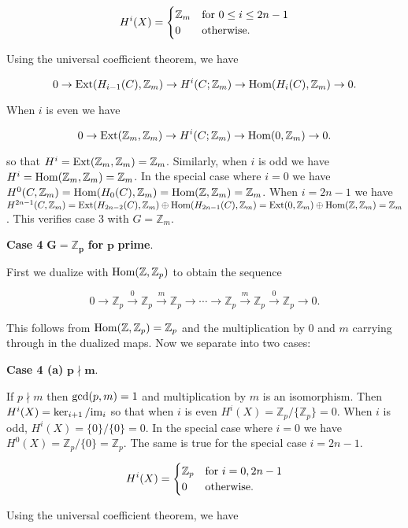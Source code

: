 \documentclass{article}
\newcommand{\Z}{\mathbb{Z}}
\newcommand{\Hom}{\textnormal{Hom}}
\newcommand{\Ext}{\textnormal{Ext}}
\newcommand{\im}{\textnormal{im}}
\begin{document}
\[H^{i}(X) = \begin{cases} \Z_{m} & \textnormal{for } 0\leq i\leq 2n-1\\
0 & \textnormal{otherwise}. \end{cases}\]
\medskip

Using the universal coefficient theorem, we have

$$0\to \Ext(H_{i-1}(C), \Z_{m})\to H^{i}(C;\Z_{m})\to \Hom(H_{i}(C),\Z_{m})\to 0.$$

When $i$ is even we have

$$0\to \Ext(\Z_{m}, \Z_{m})\to H^{i}(C;\Z_{m})\to \Hom(0,\Z_{m})\to 0.$$

so that $H^{i} = \Ext(\Z_{m},\Z_{m}) = \Z_{m}$. Similarly, when $i$ is odd we have $H^{i} = \Hom(\Z_{m},\Z_{m}) = \Z_{m}$. In the special case where $i = 0$ we have $H^{0}(C, \Z_{m}) = \Hom(H_{0}(C), \Z_{m}) = \Hom(\Z, \Z_{m}) = \Z_{m}$. When $i = 2n-1$ we have $H^{2n-1}(C, \Z_{m}) = \Ext(H_{2n-2}(C), \Z_{m})\oplus\Hom(H_{2n-1}(C), \Z_{m}) = \Ext(0, \Z_{m})\oplus\Hom(\Z, \Z_{m}) = \Z_{m}$. This verifies case 3 with $G = \Z_{m}$.
\bigskip

\textbf{Case 4} $\mathbf{G = \Z_{p}}$ \textbf{for} $\mathbf{p}$ \textbf{prime}.

First we dualize with $\Hom(\Z, \Z_{p})$ to obtain the sequence

$$0\to \Z_{p}\xrightarrow{0} \Z_{p}\xrightarrow{m} \Z_{p}\to \cdots \to \Z_{p} \xrightarrow{m}\Z_{p} \xrightarrow{0}\Z_{p}\to 0.$$

This follows from $\Hom(\Z, \Z_{p}) = \Z_{p}$ and the multiplication by 0 and $m$ carrying through in the dualized maps. Now we separate into two cases:
\medskip

\textbf{Case 4 (a)} $\mathbf{p\nmid m}$.

If $p\nmid m$ then $\textnormal{gcd}(p, m) = 1$ and multiplication by $m$ is an isomorphism. Then $H^{i}(X) = \ker_{i+1}/\im_{i}$ so that when $i$ is even $H^{i}(X) = \Z_{p}/\{\Z_{p}\} = 0$. When $i$ is odd, $H^{i}(X) = \{0\}/\{0\} = 0$. In the special case where $i = 0$ we have $H^{0}(X) = \Z_{p}/\{0\} = \Z_{p}$. The same is true for the special case $i = 2n-1$.

\[H^{i}(X) = \begin{cases} \Z_{p} & \textnormal{for } i = 0, 2n-1\\
0 & \textnormal{otherwise}. \end{cases}\]
\medskip

Using the universal coefficient theorem, we have
\end{document}
